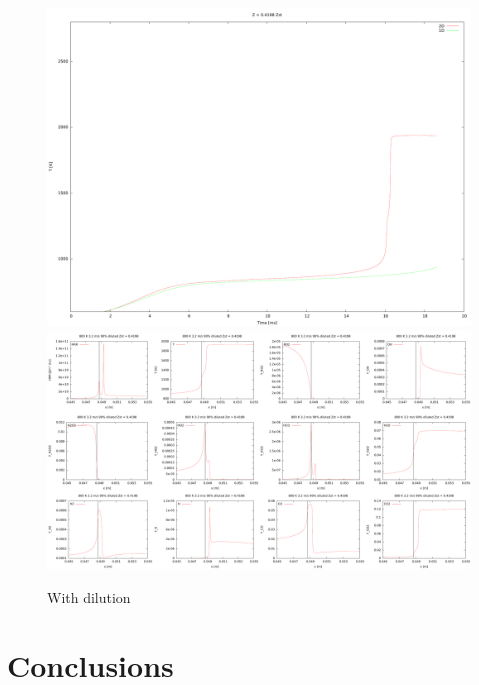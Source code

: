 \documentclass[11pt,english]{article}
\begin{document}
\begin{figure}[t]
      \centering
      \scriptsize
      \includegraphics[width=1.0\textwidth]{diluted_800.pdf}
      \includegraphics[width=1.0\textwidth]{diluted_800_structure.pdf}
      \normalsize
      \caption{With dilution}
      \label{fig:LFA_800_dilution}
    \end{figure} 

\section{Conclusions}

\end{document}
